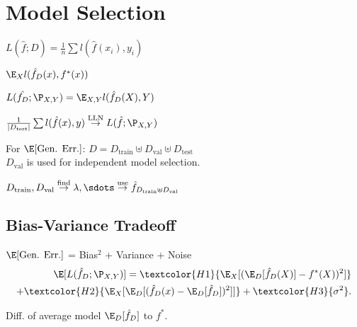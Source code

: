\section{Model Selection}
\begin{definition}
  \(L(\hat{f}; D) = \frac{1}{n}\sum l(\hat{f}(x_i), y_i)\)
\end{definition}

\begin{definition}
  \(\E_X l(\hat{f}_D(x), f^*(x))\)
\end{definition}

\begin{definition}
  \(L(\hat{f_D}; \P_{X, Y}) = \E_{X, Y} l(\hat{f}_D(X), Y)\)
\end{definition}

\begin{definition}
  \(\frac{1}{|D_{\text{test}}|} \sum l(\hat{f}(x), y) \stackrel{\text{LLN}}{\rightarrow} L(\hat{f}; \P_{X, Y})\)
\end{definition}

For \(\E[\text{Gen. Err.}]\): \(D = D_{\text{train}} \uplus D_{\text{val}} \uplus D_{\text{test}} \) \\ \(D_{\text{val}}\) is used for independent model selection.

\begin{definition}[K-Fold CV]
  \(D_{\text{train}}, D_{\text{val}} \stackrel{\text{find}}{\rightarrow} \lambda, \sdots \stackrel{\text{use}}{\rightarrow} \hat{f}_{D_{\text{train}} \uplus D_{\text{val}}}\)
\end{definition}

\subsection{Bias-Variance Tradeoff}
\(\E[\text{Gen. Err.}]\) = \textcolor{H1}{Bias\(^2\)} + \textcolor{H2}{Variance} + \textcolor{H3}{Noise}
\begin{align*}
  \E[L(\hat{f}_D; \P_{X, Y})] = \textcolor{H1}{\E_X[(\E_D[\hat{f}_D(X)] - f^*(X))^2]} \\
  + \textcolor{H2}{\E_X[\E_D[(\hat{f}_D(x) -\E_D[\hat{f}_D])^2]]} + \textcolor{H3}{\sigma^2}.
\end{align*}

\begin{definition}[\textcolor{H1}{Bias}]
  Diff. of average model \(\E_D[\hat{f}_D]\) to \(f^*\).
\end{definition}

